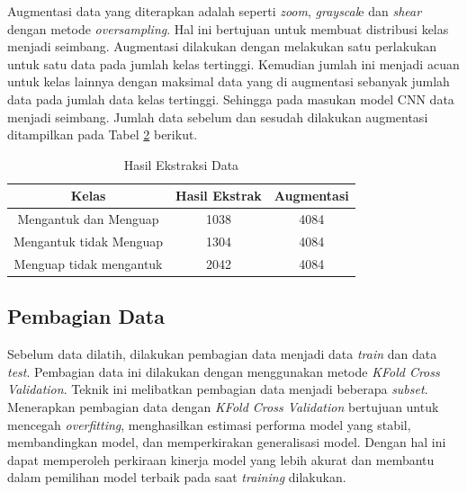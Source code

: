 \begin{table}[H]
        Augmentasi data yang diterapkan adalah seperti \textit{zoom}, \textit{grayscal}e dan \textit{shear} dengan metode \textit{oversampling}. Hal ini bertujuan untuk membuat distribusi kelas menjadi seimbang. Augmentasi dilakukan dengan melakukan satu perlakukan untuk satu data pada jumlah kelas tertinggi. Kemudian jumlah ini menjadi acuan untuk kelas lainnya dengan maksimal data yang di augmentasi sebanyak jumlah data pada jumlah data kelas tertinggi. Sehingga pada masukan model CNN data menjadi seimbang. Jumlah data sebelum dan sesudah dilakukan augmentasi ditampilkan pada Tabel \ref{Hasil Augmentasi Data} berikut.
    


            \begin{table}[h]
            \centering
            \caption{Hasil Ekstraksi Data}
            \begin{tabular}{ccc}
                \toprule
                \textbf{Kelas} & \textbf{Hasil Ekstrak} & \textbf{Augmentasi }\\
                \midrule
                      
                           Mengantuk dan Menguap & 1038 & 4084 \\
                          Mengantuk tidak Menguap & 1304 & 4084 \\
                           Menguap tidak mengantuk& 2042 & 4084 \\
                
                    \bottomrule
                \end{tabular}
                \label{Hasil Augmentasi Data}
            \end{table}



        
\newpage
    
    \subsection{Pembagian Data}
    
    Sebelum data dilatih, dilakukan pembagian data menjadi data 
    \textit{train} dan data \textit{test}. Pembagian data ini 
    dilakukan dengan menggunakan metode \textit{KFold Cross Validation}. 
    Teknik ini melibatkan pembagian data menjadi beberapa \textit{subset}. 
    Menerapkan pembagian data dengan \textit{KFold Cross Validation} 
    bertujuan untuk mencegah \textit{overfitting}, 
    menghasilkan estimasi performa model yang stabil, 
    membandingkan model, dan memperkirakan generalisasi model. 
    Dengan hal ini dapat memperoleh perkiraan kinerja model yang 
    lebih akurat dan membantu dalam pemilihan model terbaik pada 
    saat \textit{training} dilakukan. 
    

\end{table}
